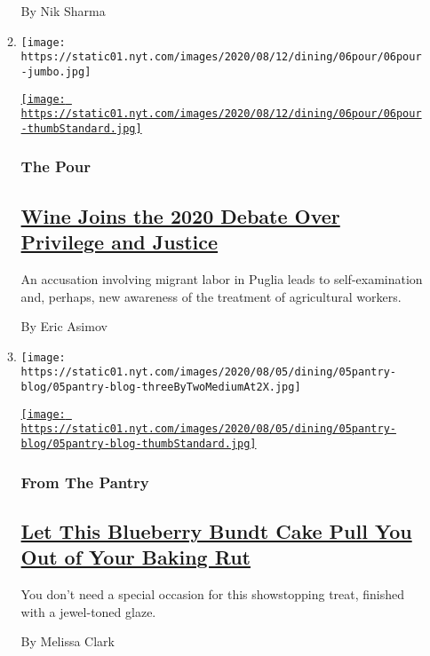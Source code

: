 \begin{enumerate}
\begin{enumerate}
    By Nik Sharma
  \item
    \texttt{[image: https://static01.nyt.com/images/2020/08/12/dining/06pour/06pour-jumbo.jpg]}

    \href{/2020/08/06/dining/drinks/valentina-passalacqua-natural-wine-italy.html}{\texttt{[image: https://static01.nyt.com/images/2020/08/12/dining/06pour/06pour-thumbStandard.jpg]}}

    \hypertarget{the-pour}{%
    \subsubsection{The Pour}\label{the-pour}}

    \hypertarget{wine-joins-the-2020-debate-over-privilege-and-justice}{%
    \subsection{\texorpdfstring{\href{/2020/08/06/dining/drinks/valentina-passalacqua-natural-wine-italy.html}{Wine
    Joins the 2020 Debate Over Privilege and
    Justice}}{Wine Joins the 2020 Debate Over Privilege and Justice}}\label{wine-joins-the-2020-debate-over-privilege-and-justice}}

    An accusation involving migrant labor in Puglia leads to
    self-examination and, perhaps, new awareness of the treatment of
    agricultural workers.

    By Eric Asimov
  \item
    \texttt{[image: https://static01.nyt.com/images/2020/08/05/dining/05pantry-blog/05pantry-blog-threeByTwoMediumAt2X.jpg]}

    \href{/2020/08/05/dining/blueberry-bundt-cake.html}{\texttt{[image: https://static01.nyt.com/images/2020/08/05/dining/05pantry-blog/05pantry-blog-thumbStandard.jpg]}}

    \hypertarget{from-the-pantry}{%
    \subsubsection{From The Pantry}\label{from-the-pantry}}

    \hypertarget{let-this-blueberry-bundt-cake-pull-you-out-of-your-baking-rut}{%
    \subsection{\texorpdfstring{\href{/2020/08/05/dining/blueberry-bundt-cake.html}{Let
    This Blueberry Bundt Cake Pull You Out of Your Baking
    Rut}}{Let This Blueberry Bundt Cake Pull You Out of Your Baking Rut}}\label{let-this-blueberry-bundt-cake-pull-you-out-of-your-baking-rut}}

    You don't need a special occasion for this showstopping treat,
    finished with a jewel-toned glaze.

    By Melissa Clark
  \end{enumerate}
\end{enumerate}

